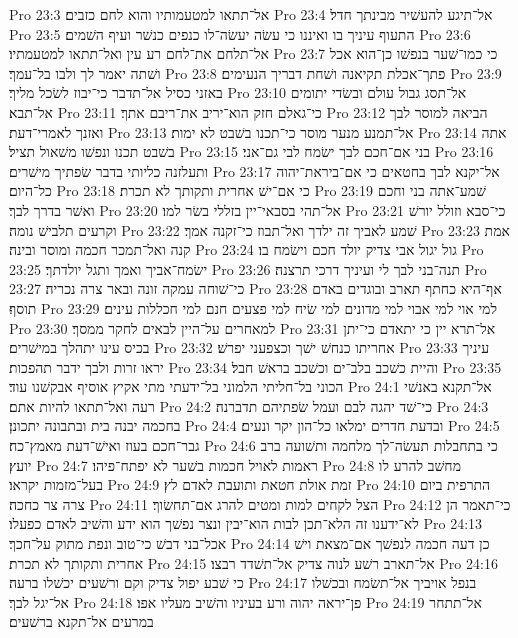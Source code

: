Pro 23:3  אל־תתאו למטעמותיו והוא לחם כזבים׃
Pro 23:4  אל־תיגע להעשׁיר מבינתך חדל׃
Pro 23:5  התעוף עיניך בו ואיננו כי עשׂה יעשׂה־לו כנפים כנשׁר ועיף השׁמים׃
Pro 23:6  אל־תלחם את־לחם רע עין ואל־תתאו למטעמתיו׃
Pro 23:7  כי כמו־שׁער בנפשׁו כן־הוא אכל ושׁתה יאמר לך ולבו בל־עמך׃
Pro 23:8  פתך־אכלת תקיאנה ושׁחת דבריך הנעימים׃
Pro 23:9  באזני כסיל אל־תדבר כי־יבוז לשׂכל מליך׃
Pro 23:10  אל־תסג גבול עולם ובשׂדי יתומים אל־תבא׃
Pro 23:11  כי־גאלם חזק הוא־יריב את־ריבם אתך׃
Pro 23:12  הביאה למוסר לבך ואזנך לאמרי־דעת׃
Pro 23:13  אל־תמנע מנער מוסר כי־תכנו בשׁבט לא ימות׃
Pro 23:14  אתה בשׁבט תכנו ונפשׁו משׁאול תציל׃
Pro 23:15  בני אם־חכם לבך ישׂמח לבי גם־אני׃
Pro 23:16  ותעלזנה כליותי בדבר שׂפתיך מישׁרים׃
Pro 23:17  אל־יקנא לבך בחטאים כי אם־ביראת־יהוה כל־היום׃
Pro 23:18  כי אם־ישׁ אחרית ותקותך לא תכרת׃
Pro 23:19  שׁמע־אתה בני וחכם ואשׁר בדרך לבך׃
Pro 23:20  אל־תהי בסבאי־יין בזללי בשׂר למו׃
Pro 23:21  כי־סבא וזולל יורשׁ וקרעים תלבישׁ נומה׃
Pro 23:22  שׁמע לאביך זה ילדך ואל־תבוז כי־זקנה אמך׃
Pro 23:23  אמת קנה ואל־תמכר חכמה ומוסר ובינה׃
Pro 23:24  גול יגול אבי צדיק יולד חכם וישׂמח בו׃
Pro 23:25  ישׂמח־אביך ואמך ותגל יולדתך׃
Pro 23:26  תנה־בני לבך לי ועיניך דרכי תרצנה׃
Pro 23:27  כי־שׁוחה עמקה זונה ובאר צרה נכריה׃
Pro 23:28  אף־היא כחתף תארב ובוגדים באדם תוסף׃
Pro 23:29  למי אוי למי אבוי למי מדונים למי שׂיח למי פצעים חנם למי חכללות עינים׃
Pro 23:30  למאחרים על־היין לבאים לחקר ממסך׃
Pro 23:31  אל־תרא יין כי יתאדם כי־יתן בכיס עינו יתהלך במישׁרים׃
Pro 23:32  אחריתו כנחשׁ ישׁך וכצפעני יפרשׁ׃
Pro 23:33  עיניך יראו זרות ולבך ידבר תהפכות׃
Pro 23:34  והיית כשׁכב בלב־ים וכשׁכב בראשׁ חבל׃
Pro 23:35  הכוני בל־חליתי הלמוני בל־ידעתי מתי אקיץ אוסיף אבקשׁנו עוד׃
Pro 24:1  אל־תקנא באנשׁי רעה ואל־תתאו להיות אתם׃
Pro 24:2  כי־שׁד יהגה לבם ועמל שׂפתיהם תדברנה׃
Pro 24:3  בחכמה יבנה בית ובתבונה יתכונן׃
Pro 24:4  ובדעת חדרים ימלאו כל־הון יקר ונעים׃
Pro 24:5  גבר־חכם בעוז ואישׁ־דעת מאמץ־כח׃
Pro 24:6  כי בתחבלות תעשׂה־לך מלחמה ותשׁועה ברב יועץ׃
Pro 24:7  ראמות לאויל חכמות בשׁער לא יפתח־פיהו׃
Pro 24:8  מחשׁב להרע לו בעל־מזמות יקראו׃
Pro 24:9  זמת אולת חטאת ותועבת לאדם לץ׃
Pro 24:10  התרפית ביום צרה צר כחכה׃
Pro 24:11  הצל לקחים למות ומטים להרג אם־תחשׂוך׃
Pro 24:12  כי־תאמר הן לא־ידענו זה הלא־תכן לבות הוא־יבין ונצר נפשׁך הוא ידע והשׁיב לאדם כפעלו׃
Pro 24:13  אכל־בני דבשׁ כי־טוב ונפת מתוק על־חכך׃
Pro 24:14  כן דעה חכמה לנפשׁך אם־מצאת וישׁ אחרית ותקותך לא תכרת׃
Pro 24:15  אל־תארב רשׁע לנוה צדיק אל־תשׁדד רבצו׃
Pro 24:16  כי שׁבע יפול צדיק וקם ורשׁעים יכשׁלו ברעה׃
Pro 24:17  בנפל אויביך אל־תשׂמח ובכשׁלו אל־יגל לבך׃
Pro 24:18  פן־יראה יהוה ורע בעיניו והשׁיב מעליו אפו׃
Pro 24:19  אל־תתחר במרעים אל־תקנא ברשׁעים׃
